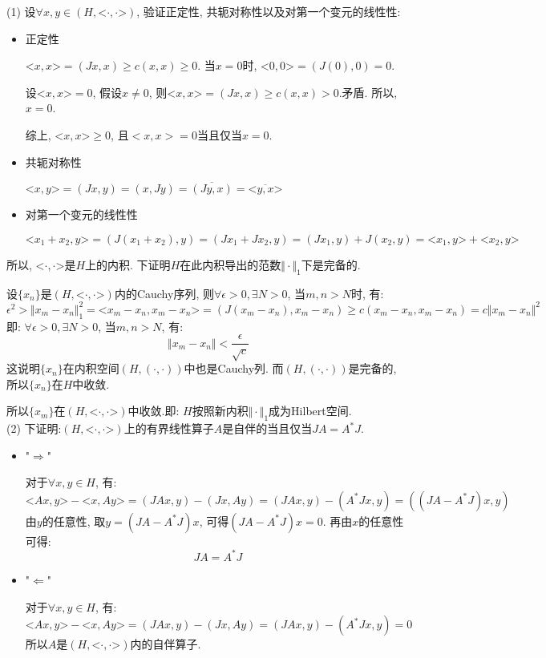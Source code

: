\documentclass{article}
\begin{document}
(1) 设$\forall x, y \in (H, \text{<}\cdot, \cdot\text{>})$, 验证正定性, 共轭对称性以及对第一个变元的线性性:
\begin{itemize}

\item 正定性 

$\text{<}x, x\text{>} = (Jx, x) \geq c(x, x) \geq 0$. 当$x=0$时, $\text{<}0, 0\text{>} = (J(0), 0) = 0$. 

设$\text{<}x, x\text{>} =0$, 假设$ x \neq 0 $, 则$\text{<}x, x\text{>} = (Jx, x) \geq c(x, x) >0$.矛盾. 所以, $x = 0$. 

综上, $\text{<}x, x\text{>} \geq 0$, 且$<x, x>=0$当且仅当$x=0$.

\item 共轭对称性

$\text{<} x, y \text{>} = (Jx, y) = (x, Jy) = \overline{(Jy, x)} =  \overline {\text{<}y, x\text{>}}$ 

\item 对第一个变元的线性性

$\text{<}x_1 + x_2, y\text{>} = (J(x_1 + x_2), y) = (Jx_1 + Jx_2, y) = (Jx_1, y) + J(x_2, y) = \text{<} x_1, y \text{>} + \text{<} x_2, y \text{>} $
\end{itemize}
所以, $\text{<}\cdot , \cdot \text{>}$是$H$上的内积. 下证明$H$在此内积导出的范数$\Vert \cdot \Vert_1$下是完备的.

设$\{ x_n \}$是$(H, \text{<} \cdot, \cdot \text{>})$内的Cauchy序列, 则$\forall \epsilon >0, \exists N>0$, 当$m, n > N$时, 有:
$$ \epsilon^2 > \Vert x_m - x_n \Vert_1^2 = \text{<}x_m - x_n, x_m - x_n  \text{>} = (J(x_m - x_n), x_m- x_n) \geq c(x_m-x_n, x_m - x_n) = c \Vert x_m - x_n \Vert^2 $$
即: $\forall \epsilon >0, \exists N>0$, 当$m,n > N$, 有:
$$ \Vert x_m - x_n  \Vert < \dfrac{\epsilon}{\sqrt{c}} $$
这说明$\{x_n \}$在内积空间$(H, (\cdot, \cdot))$中也是Cauchy列. 而$(H, (\cdot, \cdot))$是完备的, 所以$\{ x_n \}$在$H$中收敛. 

所以$\{x_m \}$在$(H, \text{<} \cdot, \cdot \text{>})$中收敛.即: $H$按照新内积$\Vert \cdot \Vert_1$成为Hilbert空间. \\

(2) 下证明:$(H, \text{<}\cdot, \cdot\text{>})$上的有界线性算子$A$是自伴的当且仅当$JA=A^*J$.
\begin{itemize}
\item "$ \Longrightarrow $"

对于$\forall x, y \in H$, 有:
$$ \text{<}Ax, y\text{>} - \text{<}x, Ay\text{>}= (JAx, y) - (Jx, Ay) = (JAx, y) - (A^*Jx, y) = ((JA - A^*J)x, y) $$
由$y$的任意性, 取$y = (JA - A^*J)x$, 可得$(JA - A^*J)x = 0$. 再由$x$的任意性可得:
$$ JA = A^*J $$

\item "$ \Longleftarrow $"

对于$\forall x, y \in H$, 有:
$$ \text{<} Ax, y \text{>} - \text{<} x, Ay \text{>} = (JAx, y) - (Jx, Ay) = (JAx, y) - (A^*Jx, y) = 0 $$
所以$A$是$(H, \text{<}\cdot, \cdot\text{>})$内的自伴算子.
\end{itemize}
\end{document}
